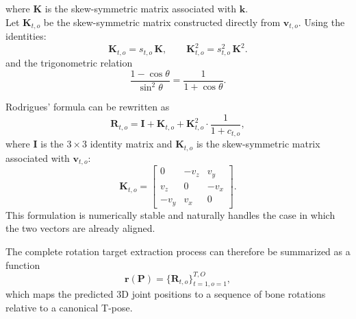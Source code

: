 where $\mathbf{K}$ is the skew-symmetric matrix associated with $\mathbf{k}$.\\
Let $\mathbf{K}_{t,o}$ be the skew-symmetric matrix constructed directly from $\mathbf{v}_{t,o}$. Using the identities:
\begin{equation}
\mathbf{K}_{t,o} = s_{t,o}\,\mathbf{K},
\qquad
\mathbf{K}_{t,o}^2 = s_{t,o}^2\,\mathbf{K}^2.
\end{equation}
and the trigonometric relation
\begin{equation}
\frac{1 - \cos\theta}{\sin^2\theta}
=
\frac{1}{1 + \cos\theta}.
\end{equation}


Rodrigues' formula can be rewritten as
\begin{equation}
    \mathbf{R}_{t,o} = \mathbf{I} + \mathbf{K}_{t,o} + \mathbf{K}_{t,o}^2 \cdot \frac{1}{1 + c_{t,o}},
\end{equation}
where $\mathbf{I}$ is the $3 \times 3$ identity matrix and $\mathbf{K}_{t,o}$ is the skew-symmetric matrix associated with $\mathbf{v}_{t,o}$:
\begin{equation}
    \mathbf{K}_{t,o} = \begin{bmatrix}
                            0 & -v_z & v_y \\
                            v_z & 0 & -v_x \\
                            -v_y & v_x & 0
                        \end{bmatrix}.
\end{equation}
This formulation is numerically stable and naturally handles the case in which the two vectors are already aligned.

The complete rotation target extraction process can therefore be summarized as a function
\begin{equation}
    \mathbf{r(P)} = \{ \mathbf{R}_{t,o} \}_{t=1,o=1}^{T,O},
\end{equation}
which maps the predicted 3D joint positions to a sequence of bone rotations relative to a canonical T-pose.

